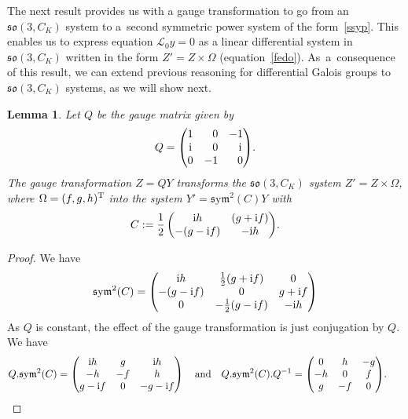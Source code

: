 \documentclass[10pt,a4paper]{amsart}
\numberwithin{equation}{section}
\newtheorem{Lemma}[Theorem]{Lemma}
\def\sym{\mathfrak{s}\mathrm{y}\mathfrak{m}}
\begin{document}
The next result provides us with a gauge transformation to go from an $\mathfrak{so}(3, C_K)$ system
to a~second symmetric power system of the form~\eqref{ssyp}. This enables us to express equation $\mathcal L_0y=0$ as a linear differential system in $\mathfrak{so}(3, C_K)$ written in the form $Z'= Z \times \Omega$ (equation~\eqref{fedo}). As~a~consequence of this result, we can extend previous reasoning for differential Galois groups to $\mathfrak{so}(3, C_K)$ systems, as we will show next.

\begin{Lemma}\label{gaugemat}
Let $Q$ be the gauge matrix given by
\begin{gather}\label{eq:gauge sltoso3}
 Q=
 \begin{pmatrix}
 	1&\hphantom{-}0&-1\\ {\rm i}&\hphantom{-}0&\hphantom{-}{\rm i}
\\ 0&-1&\hphantom{-}0
	\end{pmatrix}\!.
\end{gather}
The gauge transformation $Z=QY$ transforms the $\mathfrak{so}(3, C_K)$ system $Z'= Z \times \Omega$, where $\Omega=(f,g,h)^{\rm T}$ into the system $Y'=\sym^2(C)Y$
with
\begin{gather*}
C:= \frac{1}{2} \begin{pmatrix} {\rm i} h & (g +{\rm i}f ) \\
	 - (g - {\rm i}f ) & - {\rm i} h \end{pmatrix}\!.
\end{gather*}
\end{Lemma}

\begin{proof}
We have
\begin{gather*} \sym^2(C) = \begin{pmatrix}
{\rm i}h &\frac12(g +{\rm i} f) &0\\ -(g-{\rm i}f) &0&g+{\rm i}f \\ 0&-\frac12(g -{\rm i} f) &-{\rm i}h \end{pmatrix}
\end{gather*}
As $Q$ is constant, the effect of the gauge transformation is just conjugation by $Q$.
We have
\begin{gather*}
Q.\sym^2(C) = \begin{pmatrix}
{\rm i}h &g &{\rm i}
h \\ -h &-f
 &h \\ g -{\rm i}f &0&-g -{\rm i}f \end{pmatrix}
\quad \textrm{and} \quad
Q.\sym^2(C).Q^{-1} =\begin{pmatrix} 0&h &-g
\\ -h &0&f
\\ g &-f &0
\end{pmatrix}\!.\!\!\!\tag*{\qed}
\end{gather*}
\renewcommand{\qed}{}
\end{proof}
\end{document}
